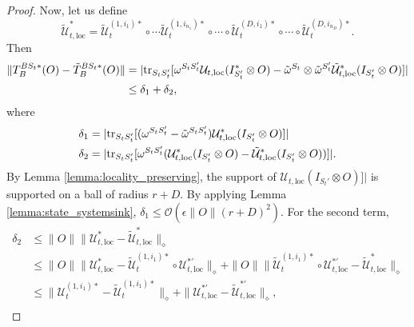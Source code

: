 \documentclass[prx,aps,amsmath,amssymb,floatfix,superscriptaddress,11pt,tightenlines,longbibliography,onecolumn,notitlepage]{revtex4-1}
\newcommand{\Tr}{\textnormal{tr}}
\begin{document}
\begin{proof}
Now, let us define 
  \begin{equation}
    \tilde{\mathcal{U}}_{t,\text{loc}}^* = \tilde{\mathcal{U}}_{t}^{(1,i_1)*}\circ \cdots \tilde{\mathcal{U}}_t^{(1,i_{n_1})*} \circ \cdots \circ \tilde{\mathcal{U}}_t^{(D,i_1)*} \circ \cdots \circ \tilde{\mathcal{U}}_t^{(D,i_{n_D})*}.
  \end{equation}
  Then
  \begin{equation}
    \begin{aligned}
      \|T_B^{BS_t*}(O) - \tilde{T}_{B}^{BS_t*}(O) \| &= |\Tr_{S_tS_t'}[\omega^{S_tS_t'} \mathcal{U}_{t,\text{loc}}(I_{S_t'}^* \otimes O) - \tilde{\omega}^{S_t}\otimes \tilde{\omega}^{S_t'} \tilde{\mathcal{U}}_{t,\text{loc}}^*(I_{S_t'} \otimes O)]| \\
      &\leq \delta_1 + \delta_2,
    \end{aligned}   
  \end{equation}
  where
  \begin{equation}
    \begin{aligned}
    &\delta_1= |\Tr_{S_tS_t'}[(\omega^{S_tS_t'} - \tilde{\omega}^{S_tS_t'}) \mathcal{U}_{t,\text{loc}}^*(I_{S_t'} \otimes O)]|  \\
    &\delta_2=|\Tr_{S_tS_t'}[\omega^{S_tS_t'}(\mathcal{U}_{t,\text{loc}}^*(I_{S_t'}\otimes O)  - \tilde{\mathcal{U}}_{t,\text{loc}}^*(I_{S_t'}\otimes O)) ]|.
    \end{aligned}
  \end{equation}
  By Lemma \ref{lemma:locality_preserving}, the support of $ \mathcal{U}_{t,\text{loc}}(I_{S_t'} \otimes O)]|$ is supported on a ball of radius $r+D$. By applying Lemma \ref{lemma:state_systemsink}, $\delta_1\leq \mathcal{O}(\epsilon\|O\|(r+D)^2)$. For the second term,
    \begin{equation}
      \begin{aligned}
        \delta_2 &\leq\|O \| \|\mathcal{U}_{t,\text{loc}}^* - \tilde{\mathcal{U}}_{t,\text{loc}}^* \|_{\diamond} \\
        &\leq \|O \|\|\mathcal{U}_{t,\text{loc}}^* - \tilde{\mathcal{U}}_{t}^{(1,i_1)*}\circ \mathcal{U}_{t,\text{loc}}^{*'} \|_{\diamond} + \|O \|\|\tilde{\mathcal{U}}_{t}^{(1,i_1)*}\circ \mathcal{U}_{t,\text{loc}}^{*'} - \tilde{\mathcal{U}}_{t,\text{loc}}^* \|_{\diamond} \\
        &\leq \|\mathcal{U}_{t}^{(1,i_1)*} - \tilde{\mathcal{U}}_t^{(1,i_1)*} \|_{\diamond} + \|\mathcal{U}_{t,\text{loc}}^{*'} - \tilde{\mathcal{U}}_{t,\text{loc}}^{*'} \|_{\diamond}, \\

\end{aligned}
\end{equation}
\end{proof}
\end{document}
